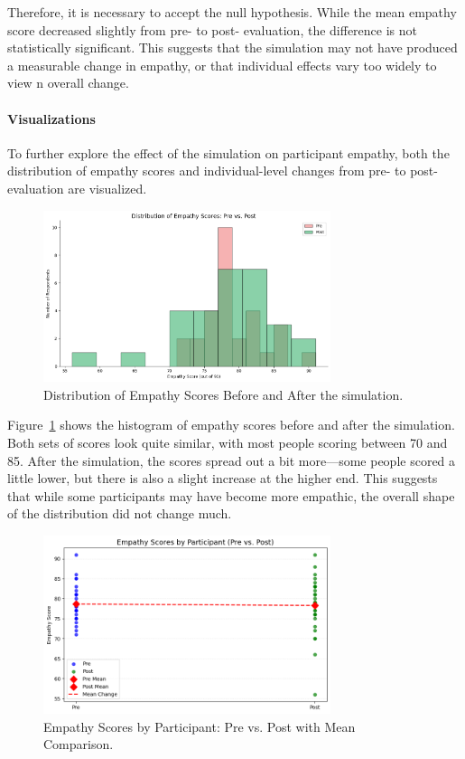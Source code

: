 \vspace{1em}

Therefore, it is necessary to accept the null hypothesis. While the mean empathy score decreased slightly from pre- to post- evaluation, the difference is not statistically significant. This suggests that the simulation may not have produced a measurable change in empathy, or that individual effects vary too widely to view n overall change.

\paragraph{Visualizations}

To further explore the effect of the simulation on participant empathy, both the distribution of empathy scores and individual-level changes from pre- to post-evaluation are visualized. 

\begin{figure}[htbp]
    \centering
    \includegraphics[width=0.75\textwidth]{../../Figures/emp-comparison.png}
    \caption{Distribution of Empathy Scores Before and After the simulation.}
    \label{fig:empathy_dist_hist}
\end{figure}

Figure~\ref{fig:empathy_dist_hist} shows the histogram of empathy scores before and after the simulation. Both sets of scores look quite similar, with most people scoring between 70 and 85. After the simulation, the scores spread out a bit more—some people scored a little lower, but there is also a slight increase at the higher end. This suggests that while some participants may have become more empathic, the overall shape of the distribution did not change much.

\begin{figure}[htbp]
    \centering
    \includegraphics[width=0.75\textwidth]{../../Figures/emph-comparison-means.png}
    \caption{Empathy Scores by Participant: Pre vs. Post with Mean Comparison.}
    \label{fig:empathy_means_line}
\end{figure}

